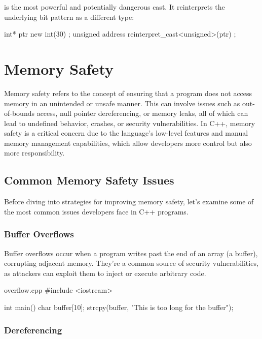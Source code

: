 \documentclass[12pt]{article}
\begin{document}
\noindent
{} is the most powerful and potentially dangerous cast.
It reinterprets the underlying bit pattern as a different type:

\begin{cxx}{}
int* ptr { new int(30) };
unsigned address { reinterpret_cast<unsigned>(ptr) };
\end{cxx}

\section{Memory Safety}

\noindent
Memory safety refers to the concept of ensuring that a program does not access memory in an unintended or unsafe manner.
This can involve issues such as out-of-bounds access, null pointer dereferencing, or memory leaks, all of which can lead to undefined behavior, crashes, or security vulnerabilities.
In C++, memory safety is a critical concern due to the language's low-level features and manual memory management capabilities, which allow developers more control but also more responsibility.

\subsection{Common Memory Safety Issues}

\noindent
Before diving into strategies for improving memory safety, let's examine some of the most common issues developers face in C++ programs.

\subsubsection{Buffer Overflows}

\noindent
Buffer overflows occur when a program writes past the end of an array (a buffer), corrupting adjacent memory.
They’re a common source of security vulnerabilities, as attackers can exploit them to inject or execute arbitrary code.

\begin{cxx}{overflow.cpp}
#include <iostream>

int main()
{
    char buffer[10];
    strcpy(buffer, "This is too long for the buffer");
}
\end{cxx}

\subsubsection{ Dereferencing}
\end{document}
